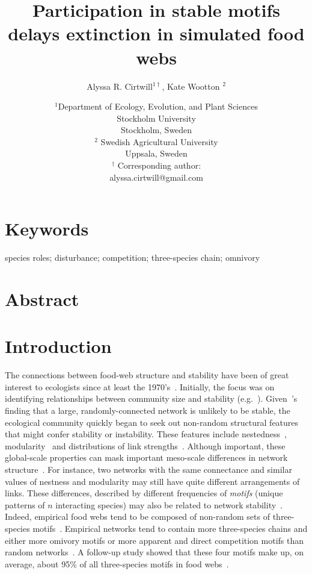\documentclass[12pt]{article}
\title{Participation in stable motifs delays extinction in simulated food webs}
\author{Alyssa R. Cirtwill$^{1\dagger}$, Kate Wootton $^{2}$}
\date{\small$^1$Department of Ecology, Evolution, and Plant Sciences\\ 
Stockholm University\\
Stockholm, Sweden\\
\medskip
\small$^2$ Swedish Agricultural University\\
Uppsala, Sweden\\
\medskip
$^\dagger$ Corresponding author:\\
alyssa.cirtwill@gmail.com\\
 }
\begin{document}
 
\maketitle 
\raggedright
\setlength{\parindent}{15pt} 


\section{Keywords}

	species roles; disturbance; competition; three-species chain; omnivory


\section{Abstract}


\section{Introduction}

	The connections between food-web structure and stability have been of great interest to ecologists since at least the 1970's~\citep{May1972}. Initially, the focus was on identifying relationships between community size and stability (e.g.~\citealp{Gardner1970,May1972}). Given~\citet{May1972}'s finding that a large, randomly-connected network is unlikely to be stable, the ecological community quickly began to seek out non-random structural features that might confer stability or instability. These features include nestedness~\citep{Allesina2012,Sauve2014}, modularity~\citep{Sauve2014,Thebault2010} and distributions of link strengths~\citep{McCann1998,Gross2009,Rooney2012,Wootton2016}. Although important, these global-scale properties can mask important meso-scale differences in network structure~\citep{Simmons2019}. For instance, two networks with the same connectance and similar values of nestness and modularity may still have quite different arrangements of links. These differences, described by different frequencies of \emph{motifs} (unique patterns of $n$ interacting species) may also be related to network stability~\citep{Prill2005,Borrelli2015,Monteiro2016}. Indeed, empirical food webs tend to be composed of non-random sets of three-species motifs~\citep{Stouffer2007}. Empirical networks tend to contain more three-species chains and either more omivory motifs or more apparent and direct competition motifs than random networks~\citep{Stouffer2007}. A follow-up study showed that these four motifs make up, on average, about 95\% of all three-species motifs in food webs~\citep{Stouffer2010b}. 
\end{document}
